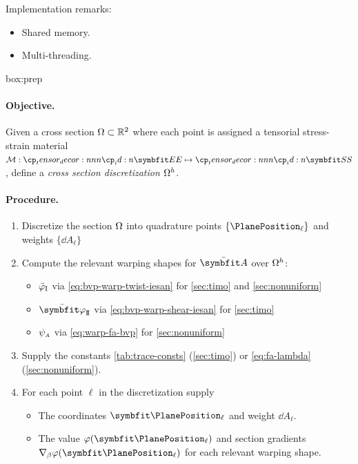 Implementation remarks:
\begin{itemize}
    \item Shared memory.
    \item Multi-threading.
\end{itemize}

\begin{ambox}{box:prep}
\paragraph{Objective.}
Given a cross section \(\Omega \subset \mathbb{R}^2\) where each point is assigned a tensorial stress-strain material \(\TensorMaterial: \StrainTensor \mapsto \StressTensor\), 
define a \emph{cross section discretization} \(\Omega^h\).
\paragraph{Procedure.}
\begin{enumerate}
    \item Discretize the section \(\Omega\) into quadrature points \(\{\PlanePosition_{\ell}\}\) and weights \(\{\dd A_{\ell}\}\)
    \item Compute the relevant warping shapes for \(\EnhanShapes\) over \(\Omega^h\):
    \begin{itemize}
        \item \(\bar{\varphi}_{\rm I}\) via \cref{eq:bvp-warp-twist-iesan} for \cref{sec:timo} and \cref{sec:nonuniform}
        \item \(\WarpShearShape\) via \cref{eq:bvp-warp-shear-iesan} for \cref{sec:timo}
        \item \(\psi_{\scriptscriptstyle{A}}\) via \cref{eq:warp-fa-bvp} for \cref{sec:nonuniform}
    \end{itemize}
    \item Supply the constants \cref{tab:trace-consts} (\cref{sec:timo}) or \eqref{eq:fa-lambda} (\cref{sec:nonuniform}). 
    \item For each point \({\ell}\) in the discretization supply 
    \begin{itemize}
        \item The coordinates \(\bm{\PlanePosition}_{\ell}\) and weight \(\dd A_{\ell}\). 
        \item The value \(\varphi(\bm{\PlanePosition}_{\ell})\) and section gradients \(\nabla_{\beta}\varphi(\bm{\PlanePosition}_{\ell})\) for each relevant warping shape. 

\end{itemize}
\end{enumerate}
\end{ambox}
